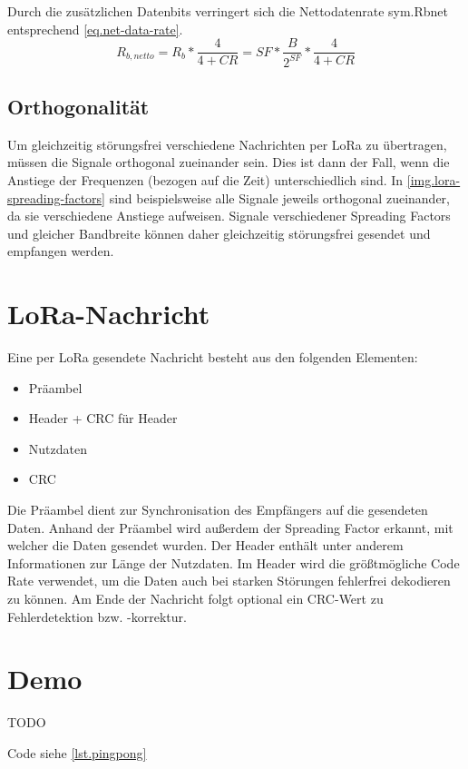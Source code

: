 Durch die zusätzlichen Datenbits verringert sich die Nettodatenrate \gls{sym.Rbnet} entsprechend \autoref{eq.net-data-rate}.
\begin{equation}
	R_{b,netto} = R_b * \frac{4}{4 + CR} = SF * \frac{B}{2^{SF}} * \frac{4}{4 + CR}
	\label{eq.net-data-rate}
\end{equation}


\subsection{Orthogonalität}
Um gleichzeitig störungsfrei verschiedene Nachrichten per LoRa zu übertragen, müssen die Signale orthogonal zueinander sein.
Dies ist dann der Fall, wenn die Anstiege der Frequenzen (bezogen auf die Zeit) unterschiedlich sind.
In \autoref{img.lora-spreading-factors} sind beispielsweise alle Signale jeweils orthogonal zueinander, da sie verschiedene Anstiege aufweisen.
Signale verschiedener Spreading Factors und gleicher Bandbreite können daher gleichzeitig störungsfrei gesendet und empfangen werden.
\cite{loraorthogonal}


\section{LoRa-Nachricht}
Eine per LoRa gesendete Nachricht besteht aus den folgenden Elementen:\cite{loralimits}
\begin{itemize}\singlespacing\setlength\itemsep{-0.2em}
\item Präambel
\item Header + \gls{CRC} für Header
\item Nutzdaten
\item \gls{CRC}
\end{itemize}
Die Präambel dient zur Synchronisation des Empfängers auf die gesendeten Daten.
Anhand der Präambel wird außerdem der Spreading Factor erkannt, mit welcher die Daten gesendet wurden.
Der Header enthält unter anderem Informationen zur Länge der Nutzdaten.
Im Header wird die größtmögliche Code Rate verwendet, um die Daten auch bei starken Störungen fehlerfrei dekodieren zu können.
Am Ende der Nachricht folgt optional ein CRC-Wert zu Fehlerdetektion bzw. -korrektur.



\section{Demo}
TODO

Code siehe \autoref{lst.pingpong}